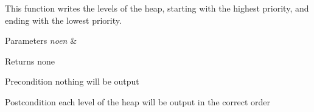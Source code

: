 \-This function writes the levels of the heap, starting with the highest priority, and ending with the lowest priority.


\begin{DoxyParams}{\-Parameters}
{\em noen} & \\
\hline
\end{DoxyParams}
\begin{DoxyReturn}{\-Returns}
none
\end{DoxyReturn}
\begin{DoxyPrecond}{\-Precondition}
nothing will be output 
\end{DoxyPrecond}
\begin{DoxyPostcond}{\-Postcondition}
each level of the heap will be output in the correct order 
\end{DoxyPostcond}


